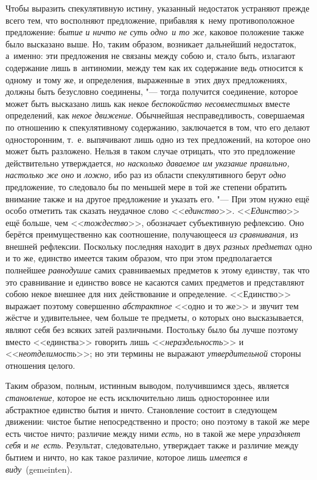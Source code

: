 Чтобы выразить спекулятивную истину, указанный недостаток устраняют прежде
всего тем, что восполняют предложение, прибавляя к~нему противоположное
предложение: {\em бытие и ничто не суть одно~и то же,} каковое положение также
было высказано выше. Но, таким образом, возникает дальнейший
недостаток, а~именно: эти предложения не связаны между собою и, стало быть,
излагают содержание лишь в~антиномии, между тем как их содержание ведь
относится к одному~и тому же, и определения, выраженные в~этих двух
предложениях, должны быть безусловно соединены, "--- тогда получится
соединение, которое может быть высказано лишь как некое {\em беспокойство
несовместимых} вместе определений, как {\em некое движение}. Обычнейшая
несправедливость, совершаемая по отношению к спекулятивному содержанию,
заключается в том, что его делают односторонним, т.~е. выпячивают лишь одно из
тех предложений, на которое оно может быть разложено. Нельзя в таком случае
отрицать, что это предложение действительно утверждается, {\em но насколько
даваемое им указание правильно, настолько же оно} и {\em ложно,} ибо раз
из области спекулятивного берут {\em одно} предложение, то следовало бы по
меньшей мере в той же степени обратить внимание также и на другое предложение и
указать его. "--- При этом нужно ещё особо отметить так сказать неудачное слово
<<{\em единство}>>. <<{\em Единство}>> ещё больше, чем <<{\em тождество}>>,
обозначает субъективную рефлексию. Оно берётся преимущественно как соотношение,
получающееся {\em из сравнивания,} из внешней рефлексии. Поскольку последняя
находит в двух {\em разных предметах} одно и то же, единство имеется таким
образом, что при этом предполагается полнейшее {\em равнодушие} самих
сравниваемых предметов к этому единству, так что это сравнивание и единство
вовсе не касаются самих предметов и представляют собою некое внешнее для них
действование и определение. <<Единство>> выражает поэтому совершенно
{\em абстрактное} <<одно и то же>> и звучит тем жёстче и удивительнее, чем
больше те предметы, о которых оно высказывается, являют себя без всяких затей
различными. Постольку было бы лучше поэтому вместо <<единства>> говорить лишь
<<{\em нераздельность}>> и <<{\em неотделимость}>>; но эти термины не выражают
{\em утвердительной} стороны отношения целого.

Таким образом, полным, истинным выводом, получившимся здесь, является
{\em становление,} которое не есть исключительно лишь одностороннее или
абстрактное единство бытия и ничто. Становление состоит в следующем движении:
чистое бытие непосредственно и просто; оно поэтому в такой же мере есть чистое
ничто; различие между ними {\em есть,} но в такой же мере {\em упраздняет себя}
и {\em не~есть}. Результат, следовательно, утверждает также и различие между
бытием и ничто, но как такое различие, которое лишь
{\em имеется в виду}~(gemeinten).

